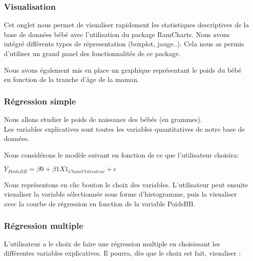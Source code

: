\documentclass[
]{article}
\begin{document}
\hypertarget{visualisation}{%
\subsubsection{Visualisation}\label{visualisation}}

Cet onglet nous permet de visualiser rapidement les statistiques
descriptives de la base de données bébé avec l'utilisation du package
RamCharts. Nous avons intégré différents types de répresentation
(boxplot, jauge..). Cela nous as permis d'utiliser un grand panel des
fonctionnalités de ce package.

Nous avons également mis en place un graphique représentant le poids du
bébé en fonction de la tranche d'âge de la maman.

\hypertarget{ruxe9gression-simple}{%
\subsubsection{Régression simple}\label{ruxe9gression-simple}}

Nous allons etudier le poids de naissance des bébés (en grammes).\\
Les variables explicatives sont toutes les variables quantitatives de
notre base de données.

Nous considérons le modèle suivant en fonction de ce que l'utilisateur
choisira:

\(Y_{PoidsBB} = \beta0 + \beta1 X1_{ChoixUtilisateur} + \epsilon\)

Nous représentons en clic bouton le choix des variables. L'utilisateur
peut ensuite visualiser la variable sélectionnée sous forme
d'histogramme, puis la visualiser avec la courbe de régression en
fonction de la variable PoidsBB.

\hypertarget{ruxe9gression-multiple}{%
\subsubsection{Régression multiple}\label{ruxe9gression-multiple}}

L'utilisateur a le choix de faire une régression multiple en choisissant
les différentes variables explicatives. Il pourra, dès que le choix est
fait, visualiser :
\end{document}
